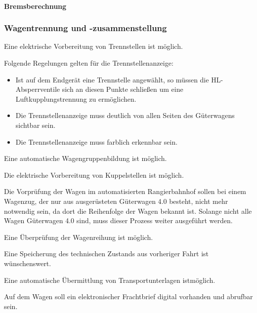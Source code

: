 \paragraph{Bremsberechnung}


\subsubsection{Wagentrennung und -zusammenstellung}
\begin{feat}
Eine elektrische Vorbereitung von Trennstellen ist möglich.
\end{feat}
\begin{rem} [zu Anf. 51]
Folgende Regelungen gelten für die Trennstellenanzeige:
\begin{itemize}
    \item Ist auf dem Endgerät eine Trennstelle angewählt, so müssen die \acrshort{HL}-Absperrventile sich an diesen Punkte schließen um eine Luftkupplungstrennung zu ermöglichen.
    \item Die Trennstellenanzeige muss deutlich von allen Seiten des Güterwagens sichtbar sein.
    \item Die Trennstellenanzeige muss farblich erkennbar sein.
\end{itemize}
\end{rem}
\begin{feat}
Eine automatische Wagengruppenbildung ist möglich.
\end{feat}
\begin{feat}
Die elektrische Vorbereitung von Kuppelstellen ist möglich.
\end{feat}
Die Vorprüfung der Wagen im automatisierten Rangierbahnhof sollen bei einem Wagenzug, der nur aus ausgerüsteten Güterwagen 4.0 besteht, nicht mehr notwendig sein, da dort die Reihenfolge der Wagen bekannt ist. Solange nicht alle Wagen Güterwagen 4.0 sind, muss dieser Prozess weiter ausgeführt werden.
\begin{feat}
Eine Überprüfung der Wagenreihung ist möglich.
\end{feat}
\begin{feat}
Eine Speicherung des technischen Zustands aus vorheriger Fahrt ist wünschenswert.
\end{feat}
\begin{feat}
Eine automatische Übermittlung von Transportunterlagen ist\newline möglich.
\end{feat}
\begin{feat}
Auf dem Wagen soll ein elektronischer Frachtbrief digital vorhanden und abrufbar sein.
\end{feat}

